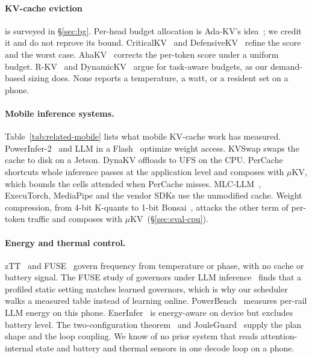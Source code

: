 \documentclass[sigconf, anonymous=false, screen=true]{acmart}
\newcommand{\muKV}{$\mu$KV}
\begin{document}
\paragraph{KV-cache eviction} is surveyed in \S\ref{sec:bg}. Per-head budget allocation is Ada-KV's idea~\cite{feng2025adakv}; we credit it and do not reprove its bound. CriticalKV~\cite{feng2025criticalkv} and DefensiveKV~\cite{feng2025defensivekv} refine the score and the worst case. AhaKV~\cite{gu2025ahakv} corrects the per-token score under a uniform budget. R-KV~\cite{cai2025rkv} and DynamicKV~\cite{zhou2024dynamickv} argue for task-aware budgets, as our demand-based sizing does. None reports a temperature, a watt, or a resident set on a phone.

\paragraph{Mobile inference systems.} Table~\ref{tab:related-mobile} lists what mobile KV-cache work has measured. PowerInfer-2~\cite{song2024powerinfer2} and LLM in a Flash~\cite{alizadeh2023llm} optimize weight access. KVSwap swaps the cache to disk on a Jetson. DynaKV offloads to UFS on the CPU. PerCache~\cite{liu2025percache} shortcuts whole inference passes at the application level and composes with \muKV, which bounds the cells attended when PerCache misses. MLC-LLM~\cite{mlcllm}, ExecuTorch, MediaPipe and the vendor SDKs use the unmodified cache. Weight compression, from 4-bit K-quants to 1-bit Bonsai~\cite{prismml2026bonsai}, attacks the other term of per-token traffic and composes with \muKV\ (\S\ref{sec:eval-cpu}).

\paragraph{Energy and thermal control.} zTT~\cite{kim2021ztt} and FUSE~\cite{liu2022fuse} govern frequency from temperature or phase, with no cache or battery signal. The FUSE study of governors under LLM inference~\cite{zhang2025fusellm} finds that a profiled static setting matches learned governors, which is why our scheduler walks a measured table instead of learning online. PowerBench~\cite{cai2026powerbench} measures per-rail LLM energy on this phone. EnerInfer~\cite{zou2026enerinfer} is energy-aware on device but excludes battery level. The two-configuration theorem~\cite{kim2015racepace} and JouleGuard~\cite{hoffmann2015jouleguard} supply the plan shape and the loop coupling. We know of no prior system that reads attention-internal state and battery and thermal sensors in one decode loop on a phone.
\end{document}
